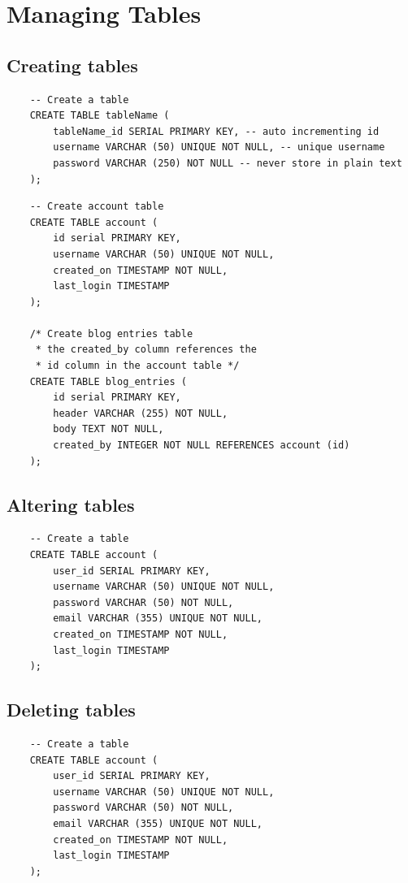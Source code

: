 \section{Managing Tables}

\subsection{Creating tables}
\begin{verbatim}
    -- Create a table
    CREATE TABLE tableName (
        tableName_id SERIAL PRIMARY KEY, -- auto incrementing id
        username VARCHAR (50) UNIQUE NOT NULL, -- unique username
        password VARCHAR (250) NOT NULL -- never store in plain text
    );
\end{verbatim}

\begin{verbatim}
    -- Create account table
    CREATE TABLE account (
        id serial PRIMARY KEY,
        username VARCHAR (50) UNIQUE NOT NULL,
        created_on TIMESTAMP NOT NULL, 
        last_login TIMESTAMP
    );
    
    /* Create blog entries table
     * the created_by column references the 
     * id column in the account table */
    CREATE TABLE blog_entries (
        id serial PRIMARY KEY, 
        header VARCHAR (255) NOT NULL,
        body TEXT NOT NULL,
        created_by INTEGER NOT NULL REFERENCES account (id)
    );
\end{verbatim}

\subsection{Altering tables}
\begin{verbatim}
    -- Create a table
    CREATE TABLE account (
        user_id SERIAL PRIMARY KEY,
        username VARCHAR (50) UNIQUE NOT NULL,
        password VARCHAR (50) NOT NULL,
        email VARCHAR (355) UNIQUE NOT NULL,
        created_on TIMESTAMP NOT NULL,
        last_login TIMESTAMP
    );
\end{verbatim}

\subsection{Deleting tables}
\begin{verbatim}
    -- Create a table
    CREATE TABLE account (
        user_id SERIAL PRIMARY KEY,
        username VARCHAR (50) UNIQUE NOT NULL,
        password VARCHAR (50) NOT NULL,
        email VARCHAR (355) UNIQUE NOT NULL,
        created_on TIMESTAMP NOT NULL,
        last_login TIMESTAMP
    );
\end{verbatim}


